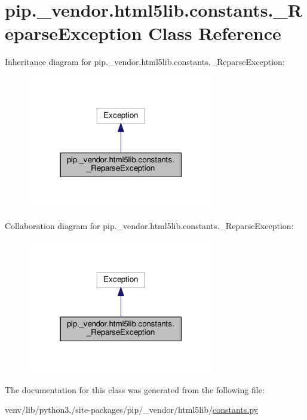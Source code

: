 \hypertarget{classpip_1_1__vendor_1_1html5lib_1_1constants_1_1__ReparseException}{}\section{pip.\+\_\+vendor.\+html5lib.\+constants.\+\_\+\+Reparse\+Exception Class Reference}
\label{classpip_1_1__vendor_1_1html5lib_1_1constants_1_1__ReparseException}


Inheritance diagram for pip.\+\_\+vendor.\+html5lib.\+constants.\+\_\+\+Reparse\+Exception\+:
\nopagebreak
\begin{figure}[H]
\begin{center}
\leavevmode
\includegraphics[width=232pt]{classpip_1_1__vendor_1_1html5lib_1_1constants_1_1__ReparseException__inherit__graph}
\end{center}
\end{figure}


Collaboration diagram for pip.\+\_\+vendor.\+html5lib.\+constants.\+\_\+\+Reparse\+Exception\+:
\nopagebreak
\begin{figure}[H]
\begin{center}
\leavevmode
\includegraphics[width=232pt]{classpip_1_1__vendor_1_1html5lib_1_1constants_1_1__ReparseException__coll__graph}
\end{center}
\end{figure}


The documentation for this class was generated from the following file\+:\begin{DoxyCompactItemize}
\item 
venv/lib/python3./site-\/packages/pip/\+\_\+vendor/html5lib/\hyperlink{pip_2__vendor_2html5lib_2constants_8py}{constants.\+py}\end{DoxyCompactItemize}
